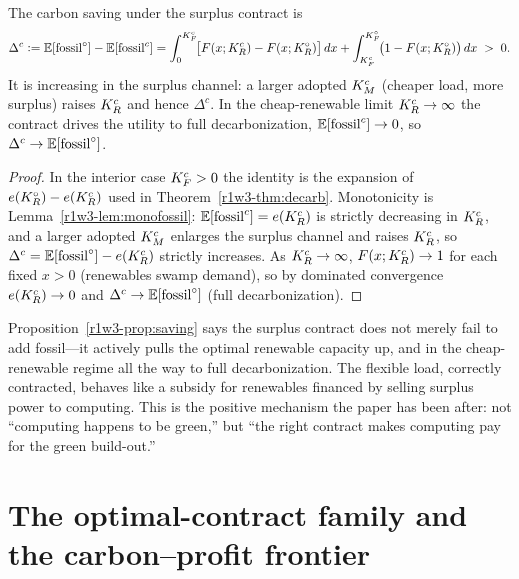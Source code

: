 \begin{proposition}\label{r1w3-prop:saving}
The carbon saving under the surplus contract is
\begin{equation}\label{r1w3-eq:exactsave}
  \Delta^{c}\vcentcolon=\mathbb{E}[\mathrm{fossil}^{\circ}]-\mathbb{E}[\mathrm{fossil}^{c}]
  =\int_0^{K_F^{c}}\!\!\big[F(x;K_R^{c})-F(x;K_R^{\circ})\big]\,dx
   +\int_{K_F^{c}}^{K_F^{\circ}}\!\!\big(1-F(x;K_R^{\circ})\big)\,dx \;>\;0 .
\end{equation}
It is increasing in the surplus channel: a larger adopted $K_M^{c}$ (cheaper load, more
surplus) raises $K_R^{c}$ and hence $\Delta^{c}$. In the cheap-renewable limit
$K_R^{c}\to\infty$ the contract drives the utility to full decarbonization,
$\mathbb{E}[\mathrm{fossil}^{c}]\to0$, so $\Delta^{c}\to\mathbb{E}[\mathrm{fossil}^{\circ}]$.
\end{proposition}

\begin{proof}
In the interior case $K_F^{c}>0$ the identity is the expansion of
$e(K_R^{\circ})-e(K_R^{c})$ used in Theorem~\ref{r1w3-thm:decarb}. Monotonicity is
Lemma~\ref{r1w3-lem:monofossil}: $\mathbb{E}[\mathrm{fossil}^{c}]=e(K_R^{c})$ is strictly decreasing in $K_R^{c}$,
and a larger adopted $K_M^{c}$ enlarges the surplus channel and raises $K_R^{c}$, so
$\Delta^{c}=\mathbb{E}[\mathrm{fossil}^{\circ}]-e(K_R^{c})$ strictly increases. As $K_R^{c}\to\infty$,
$F(x;K_R^{c})\to1$ for each fixed $x>0$ (renewables swamp demand), so by dominated
convergence $e(K_R^{c})\to0$ and $\Delta^{c}\to\mathbb{E}[\mathrm{fossil}^{\circ}]$ (full decarbonization).
\end{proof}

\begin{remark}
Proposition~\ref{r1w3-prop:saving} says the surplus contract does not merely fail to add
fossil---it actively pulls the optimal renewable capacity up, and in the cheap-renewable
regime all the way to full decarbonization. The flexible load, correctly contracted,
behaves like a subsidy for renewables financed by selling surplus power to computing.
This is the positive mechanism the paper has been after: not ``computing happens to be
green,'' but ``the right contract makes computing pay for the green build-out.''
\end{remark}

\section{The optimal-contract family and the carbon--profit frontier}\label{r1w3-sec:family}

